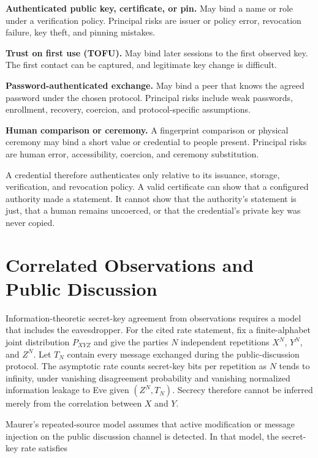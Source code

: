 \medskip
\noindent\textbf{Authenticated public key, certificate, or pin.}
May bind a name or role under a verification policy.  Principal risks are
issuer or policy error, revocation failure, key theft, and pinning mistakes.

\medskip
\noindent\textbf{Trust on first use (TOFU).}
May bind later sessions to the first observed key.  The first contact can be
captured, and legitimate key change is difficult.

\medskip
\noindent\textbf{Password-authenticated exchange.}
May bind a peer that knows the agreed password under the chosen protocol.
Principal risks include weak passwords, enrollment, recovery, coercion, and
protocol-specific assumptions.

\medskip
\noindent\textbf{Human comparison or ceremony.}
A fingerprint comparison or physical ceremony may bind a short value or
credential to people present.  Principal risks are human error, accessibility,
coercion, and ceremony substitution.

A credential therefore authenticates only relative to its issuance, storage,
verification, and revocation policy.  A valid certificate can show that a
configured authority made a statement.  It cannot show that the authority's
statement is just, that a human remains uncoerced, or that the credential's
private key was never copied.

\section{Correlated Observations and Public Discussion}

Information-theoretic secret-key agreement from observations requires a model
that includes the eavesdropper.  For the cited rate statement, fix a
finite-alphabet joint distribution $P_{XYZ}$ and give the parties $N$
independent repetitions $X^N$, $Y^N$, and $Z^N$.  Let $T_N$ contain every
message exchanged during the public-discussion protocol.  The asymptotic rate
counts secret-key bits per repetition as $N$ tends to infinity, under vanishing
disagreement probability and vanishing normalized information leakage to Eve
given $(Z^N,T_N)$.  Secrecy therefore cannot be inferred merely from the
correlation between $X$ and $Y$.

Maurer's repeated-source model assumes that active modification or message
injection on the public discussion channel is detected.  In that model, the
secret-key rate satisfies\cite{maurer1993secretkey}


